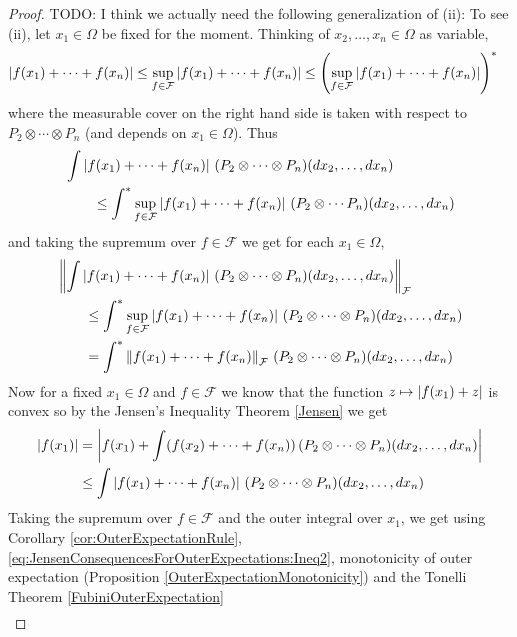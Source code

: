 \begin{proof}
TODO: I think we actually need the following generalization of (ii):
To see (ii), let $x_1 \in \Omega$ be fixed for the moment.  Thinking of $x_2, \dotsc, x_n \in \Omega$ as variable,
\begin{align*}
\left \vert f(x_1) + \dotsb + f(x_n) \right \vert &\leq \sup_{f \in \mathcal{F}} \left \vert f(x_1) + \dotsb + f(x_n) \right \vert \leq \left(\sup_{f \in \mathcal{F}} \left \vert f(x_1) + \dotsb + f(x_n) \right \vert \right)^*
\end{align*}
where the measurable cover on the right hand side is taken with respect to $P_2 \otimes \dotsb \otimes P_n$ (and depends on $x_1 \in \Omega$).  Thus 
\begin{align*}
&\int \left \vert f(x_1) + \dotsb + f(x_n) \right \vert \, (P_2 \otimes \dotsb \otimes P_n)(dx_2, \dotsc, dx_n) \\
&\qquad \leq \int^* \sup_{f \in \mathcal{F}} \left \vert f(x_1) +  \dotsb + f(x_n) \right \vert \, (P_2 \otimes \dotsb P_n)(dx_2, \dotsc, dx_n)
\end{align*} 
and taking the supremum over $f \in \mathcal{F}$ we get for each $x_1 \in \Omega$,
\begin{align}
&\left \lVert \int \left \vert f(x_1) + \dotsb + f(x_n) \right \vert \, (P_2 \otimes \dotsb \otimes P_n)(dx_2, \dotsc, dx_n) \right \rVert_{\mathcal{F}} \\
&\qquad \leq \int^* \sup_{f \in \mathcal{F}} \left \vert f(x_1) + \dotsb + f(x_n) \right \vert \, (P_2 \otimes \dotsb \otimes P_n)(dx_2, \dotsc, dx_n) \\
&\qquad = \int^* \left \lVert f(x_1)+ \dotsb + f(x_n) \right \rVert_{\mathcal{F}} \, (P_2 \otimes \dotsb \otimes P_n) (dx_2, \dotsc, dx_n)
\end{align}\label{eq:JensenConsequencesForOuterExpectations:Ineq2}
Now for a fixed $x_1 \in \Omega$ and $f \in \mathcal{F}$ we know that the function $z \mapsto \left \vert f(x_1) + z \right \vert$ is convex so by the Jensen's Inequality Theorem \ref{Jensen} we get 
\begin{align*}
\left \vert f(x_1) \right \vert &= \left \vert f(x_1) + \int ( f(x_2) + \dotsb + f(x_n) )\, (P_2 \otimes \dotsb \otimes P_n)(dx_2, \dotsc, dx_n) \right \vert \\
&\leq \int \left \vert f(x_1) + \dotsb + f(x_n) \right \vert \, (P_2 \otimes \dotsb \otimes P_n)(dx_2, \dotsc, dx_n) 
\end{align*}
Taking the supremum over $f \in \mathcal{F}$ and the outer integral over $x_1$, we get using Corollary \ref{cor:OuterExpectationRule}, \eqref{eq:JensenConsequencesForOuterExpectations:Ineq2}, monotonicity of outer expectation (Proposition \ref{OuterExpectationMonotonicity}) and the Tonelli Theorem \ref{FubiniOuterExpectation}
\begin{align*}

\end{align*}
\end{proof}
